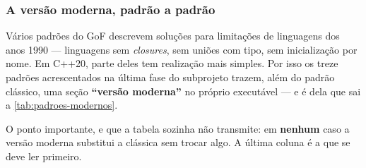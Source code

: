 \subsubsection{A versão moderna, padrão a padrão}
\label{sec:padroes-modernos}

Vários padrões do GoF descrevem soluções para limitações de linguagens dos anos
1990 --- linguagens sem \emph{closures}, sem uniões com tipo, sem inicialização
por nome. Em C++20, parte deles tem realização mais simples. Por isso os treze
padrões acrescentados na última fase do subprojeto trazem, além do padrão
clássico, uma seção \textbf{``versão moderna''} no próprio executável --- e é
dela que sai a \cref{tab:padroes-modernos}.

O ponto importante, e que a tabela sozinha não transmite: em \textbf{nenhum}
caso a versão moderna substitui a clássica sem trocar algo. A última coluna é a
que se deve ler primeiro.

